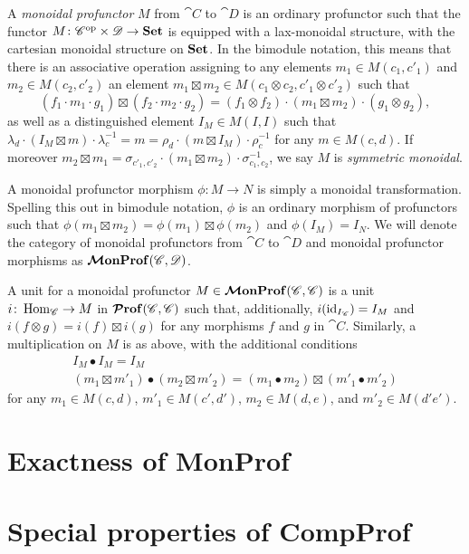 \documentclass[12pt,oneside,article,draft]{memoir}
\begin{document}
A \emph{monoidal profunctor} $M$ from $\cat{C}$ to $\cat{D}$ is an ordinary profunctor such that the
functor $M\colon {\mathscr{C}}^{\text{op}}\times\mathscr{D}\to\mathbf{Set}$ is equipped with a lax-monoidal structure, with
the cartesian monoidal structure on $\mathbf{Set}$.  In the bimodule notation, this means that there is an
associative operation assigning to any elements $m_1\in M(c_1,c'_1)$ and $m_2\in M(c_2,c'_2)$ an
element $m_1\boxtimes m_2\in M(c_1\otimes c_2,c'_1\otimes c'_2)$ such that
\[
   (f_1\cdot m_1\cdot g_1)\boxtimes(f_2\cdot m_2\cdot g_2) = (f_1\otimes f_2)\cdot(m_1\boxtimes m_2)\cdot(g_1\otimes g_2),
\]
as well as a distinguished element $I_M\in M(I,I)$ such that $\lambda_d\cdot(I_M\boxtimes
m)\cdot\lambda^{-1}_c = m = \rho_d\cdot(m\boxtimes I_M)\cdot\rho^{-1}_c$ for any $m\in M(c,d)$.  If
moreover $m_2\boxtimes m_1 = \sigma_{c'_1,c'_2}\cdot(m_1\boxtimes m_2)\cdot\sigma_{c_1,c_2}^{-1}$,
we say $M$ is \emph{symmetric monoidal}.

A monoidal profunctor morphism $\phi\colon M\to N$ is simply a monoidal transformation.  Spelling
this out in bimodule notation, $\phi$ is an ordinary morphism of profunctors such that
$\phi(m_1\boxtimes m_2)=\phi(m_1)\boxtimes\phi(m_2)$ and $\phi(I_M)=I_N$.  We will denote the
category of monoidal profunctors from $\cat{C}$ to $\cat{D}$ and monoidal profunctor morphisms as
$\bm{\mathcal{M}}\mathbf{onProf}(\mathscr{C},\mathscr{D})$.

A unit for a monoidal profunctor $M\in\bm{\mathcal{M}}\mathbf{onProf}(\mathscr{C},\mathscr{C})$ is a unit $i\colon\operatorname{Hom}_{\mathscr{C}}\to
M$ in $\bm{\mathcal{P}}\mathbf{rof}(\mathscr{C},\mathscr{C})$ such that, additionally, $i(\operatorname{id}_{I_{\mathscr{C}}})=I_M$ and $i(f\otimes
g)=i(f)\boxtimes i(g)$ for any morphisms $f$ and $g$ in $\cat{C}$.  Similarly, a multiplication on
$M$ is as above, with the additional conditions
\begin{gather*}
   I_M\bullet I_M=I_M \\
   (m_1\boxtimes m'_1)\bullet(m_2\boxtimes m'_2) = (m_1\bullet m_2)\boxtimes(m'_1\bullet m'_2)
\end{gather*}
for any $m_1\in M(c,d)$, $m'_1\in M(c',d')$, $m_2\in M(d,e)$, and $m'_2\in M(d'e')$.


\section{Exactness of MonProf}

\section{Special properties of CompProf}
\end{document}
